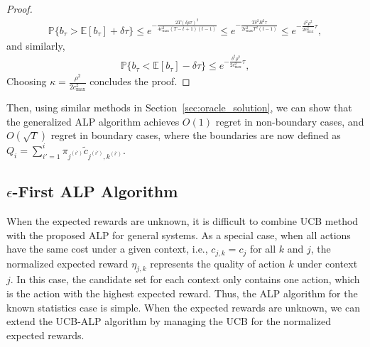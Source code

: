 \begin{proof}
\begin{eqnarray}
\mathbb{P}\{b_{\tau} > \mathbb{E}[b_{\tau}] + \delta \tau \}\leq  e^{-\frac{2T (\delta \rho\tau)^2}{4c_{\max}^2(T-t+1)(t-1)}}\leq e^{-\frac{T \delta^2B^2\tau}{2c_{\max}^2T^2(t-1)}}
\leq e^{-\frac{\delta^2\rho^2}{2c_{\max}^2}\tau},
\end{eqnarray}
and similarly,
\begin{eqnarray}
\mathbb{P}\{b_{\tau} < \mathbb{E}[b_{\tau}] - \delta \tau \}\leq e^{-\frac{\delta^2\rho^2}{2c_{\max}^2}\tau},
\end{eqnarray}
Choosing $\kappa = \frac{\rho^2}{2c_{\max}^2}$ concludes the proof.
\end{proof}
Then, using similar methods in Section~\ref{sec:oracle_solution}, we can show that the generalized ALP algorithm achieves $O(1)$ regret in non-boundary cases, and $O(\sqrt{T})$ regret in boundary cases, where the boundaries are now defined as $Q_i = \sum_{i' = 1}^i\pi_{j^{(i')}} \tilde{c}_{j^{(i')},k^{(i')}}$.

%

\subsection{$\epsilon$-First ALP Algorithm}
When the expected rewards are unknown, it is difficult to combine UCB method with the proposed ALP for general systems.
As a special case, when  all actions have the same cost under a given context, i.e., $c_{j,k} = c_j$ for all $k$ and $j$, the normalized expected reward $\eta_{j,k}$ represents the quality of action $k$ under context $j$. In this case, the candidate set for each context only contains one action, which is the action with the highest expected reward.
Thus, the ALP algorithm for the known statistics case is simple. When the expected rewards are unknown, we can extend the UCB-ALP algorithm by managing the UCB for the normalized expected rewards.

